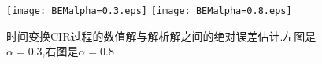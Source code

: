 \begin{figure}[htp!]
	\centering
	\texttt{[image: BEMalpha=0.3.eps]}
	\hfill
	\texttt{[image: BEMalpha=0.8.eps]}
	\caption{时间变换CIR过程的数值解与解析解之间的绝对误差估计.左图是$\alpha=0.3$,右图是$\alpha=0.8$}
	\label{fig:image}
	\vspace{-2ex}
\end{figure}

